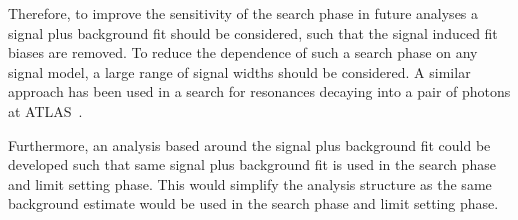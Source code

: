 Therefore, to improve the sensitivity of the search phase in future analyses
a signal plus background fit should be considered, such that the signal induced fit biases are removed.
To reduce the dependence of such a search phase on any signal model, a large range of signal widths should be considered. 
A similar approach has been used in a search for resonances decaying into a pair of photons at ATLAS~\cite{fut-diphoton}.

Furthermore, an analysis based around the signal plus background fit could be developed
such that same signal plus background fit is used in the search phase and limit setting phase.
This would simplify the analysis structure as the same background estimate would
be used in the search phase and limit setting phase.
